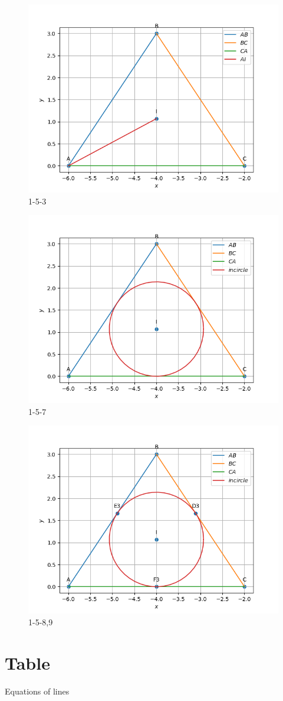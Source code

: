 \documentclass[journal,12pt,onecolumn]{IEEEtran}
\theoremstyle{remark}
\begin{document}
\begin{figure}[!ht]
	\centering
	\includegraphics[width=0.5\columnwidth]{figs/1-5-3.png}
	\caption{1-5-3}
	\label{fig33:Triangle_with_centroid}	
\end{figure}
\begin{figure}[!ht]
	\centering
	\includegraphics[width=0.5\columnwidth]{figs/1-5-7.png}
	\caption{1-5-7}
	\label{fig33:Triangle_with_centroid}	
\end{figure}
\begin{figure}[!ht]
	\centering
	\includegraphics[width=0.5\columnwidth]{figs/1-5-8,9.png}
	\caption{1-5-8,9}
	\label{fig33:Triangle_with_centroid}	
\end{figure}
\section{Table}
\begin{table}[!ht]
	
	\caption{Equations of lines}
	\label{tab33:equations}	
\end{table}
\end{document}
